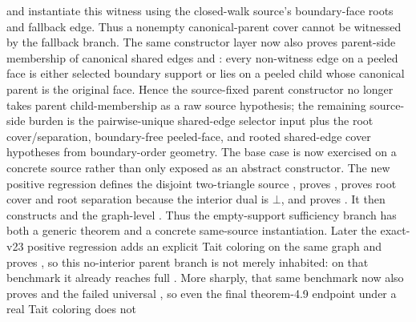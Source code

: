 \documentclass[11pt]{article}
\begin{document}
and
instantiate this witness using the closed-walk source's boundary-face roots and
fallback edge.  Thus a nonempty canonical-parent cover cannot be witnessed by
the fallback branch.  The same constructor layer now also proves parent-side
membership of canonical shared edges and
: every
non-witness edge on a peeled face is either selected boundary support or lies on
a peeled child whose canonical parent is the original face.  Hence the
source-fixed parent constructor no longer takes parent child-membership as a
raw source hypothesis; the remaining source-side burden is the pairwise-unique
shared-edge selector input plus the root cover/separation, boundary-free
peeled-face, and rooted shared-edge cover hypotheses from boundary-order
geometry.
The base case is now exercised on a concrete source rather than only exposed as
an abstract constructor.  The new positive regression
defines the disjoint two-triangle source
, proves
, proves root cover and root
separation because the interior dual is \(\bot\), and proves
.  It then constructs
 and
the graph-level
.
Thus the empty-support sufficiency branch has both a generic theorem and a
concrete same-source instantiation.  Later the exact-v23 positive regression
adds an explicit Tait coloring on the same graph and proves
,
so this no-interior parent branch is not merely inhabited: on that benchmark
it already reaches full .  More sharply,
that same benchmark now also proves
and the failed universal
,
so even the final theorem-4.9 endpoint under a real Tait coloring does not
\end{document}

